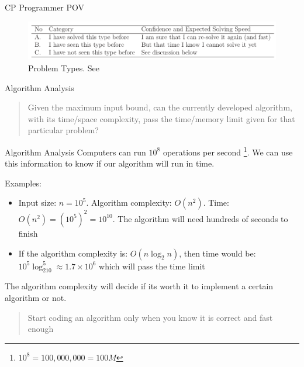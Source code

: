 \documentclass{beamer}
\begin{document}
\begin{frame}{CP Programmer POV}
    \begin{figure}
        \centering
        \includegraphics[scale=0.3]{imgs/1-CompetitiveProgramming/cp_expected_abilities.png}
        \caption{Problem Types. See \cite{Halim}}
        \label{fig:CP_problem_categories_programmer_POV}
    \end{figure}
\end{frame}

\begin{frame}{Algorithm Analysis}
    \begin{quote}
        Given the maximum input bound, can the currently developed algorithm, with its time/space complexity, pass the time/memory limit given for that particular problem?
    \end{quote}
\end{frame}

\begin{frame}{Algorithm Analysis}
    Computers can run $10^8$ operations per second \footnote{$10^8 = 100,000,000 = 100M$}. We can use this information to know if our algorithm will run in time. 
    
    Examples:
    \begin{itemize}
        \item Input size: $n=10^5$. Algorithm complexity: $O(n^2)$. Time: $O(n^2) = (10^5)^2 = 10^{10}$. The algorithm will need hundreds of seconds to finish
        \item If the algorithm complexity is: $O(n\log_2n)$, then time would be: $10^5\log_210^5 \approx 1.7\times 10^6$ which will pass the time limit
    \end{itemize}
    
    The algorithm complexity will decide if its worth it to implement a certain algorithm or not. 
    \begin{quote}
        Start coding an algorithm only when you know it is correct and fast enough
    \end{quote}
\end{frame}
\end{document}
